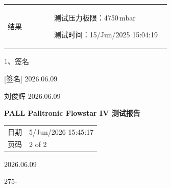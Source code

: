 \documentclass[UTF8,10pt,a4paper,fontset=fandol]{ctexart}
\newcommand{\fieldvalue}[1]{#1}
\newcommand{\handwritten}[1]{#1}
\begin{document}
\vspace{0.8em}

\begin{tabular}{@{}p{0.27\linewidth}p{0.68\linewidth}@{}}
结果 &
\begin{minipage}[t]{0.68\linewidth}
测试压力极限：4750\,mbar

测试时间：15/Jun/2025 15:04:19
\end{minipage}
\end{tabular}

\vspace{1em}

1、签名

\fieldvalue{\handwritten{[签名]}}
\hspace{2em}
\fieldvalue{\handwritten{2026.06.09}}

\vspace{1.5em}

\handwritten{刘俊辉 2026.06.09}

\hfill

\begin{minipage}[t]{0.42\linewidth}
\begin{center}
\textbf{PALL Palltronic Flowstar IV 测试报告}

\begin{tabular}{@{}ll@{}}
日期 &
\fieldvalue{5/Jun/2026 15:45:17}
\\
页码 &
\fieldvalue{2 of 2}
\end{tabular}

\vspace{1em}

\begin{center}
\end{center}

\handwritten{2026.06.09}

\handwritten{275-}
\end{center}
\end{minipage}
\end{document}
